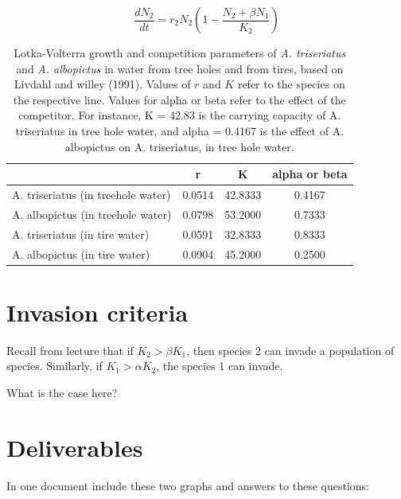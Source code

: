 \documentclass[
  letterpaper,
  DIV=11,
  numbers=noendperiod]{scrreprt}
\begin{document}
\[\frac{dN_2}{dt} = r_2N_2 \left( 1- \frac{N_2 + \beta N_1}{K_2}\right)\]

\begin{longtable}[]{@{}lccc@{}}

\caption{\label{tbl-mosquito}Lotka-Volterra growth and competition
parameters of \emph{A. triseriatus} and \emph{A. albopictus} in water
from tree holes and from tires, based on Livdahl and willey (1991).
Values of \(r\) and \(K\) refer to the species on the respective line.
Values for alpha or beta refer to the effect of the competitor. For
instance, K = 42.83 is the carrying capacity of A. triseriatus in tree
hole water, and alpha = 0.4167 is the effect of A. albopictus on A.
triseriatus, in tree hole water.}

\tabularnewline

\toprule\noalign{}
& r & K & alpha or beta \\
\midrule\noalign{}
\endhead
\bottomrule\noalign{}
\endlastfoot
A. triseriatus (in treehole water) & 0.0514 & 42.8333 & 0.4167 \\
A. albopictus (in treehole water) & 0.0798 & 53.2000 & 0.7333 \\
A. triseriatus (in tire water) & 0.0591 & 32.8333 & 0.8333 \\
A. albopictus (in tire water) & 0.0904 & 45.2000 & 0.2500 \\

\end{longtable}

\section{Invasion criteria}\label{invasion-criteria}

Recall from lecture that if \(K_2 > \beta K_1\), then species 2 can
invade a population of species. Similarly, if \(K_1 > \alpha K_2\), the
species 1 can invade.

What is the case here?

\section{Deliverables}\label{sec-deliverables-di}

In one document include these two graphs and answers to these questions:
\end{document}
